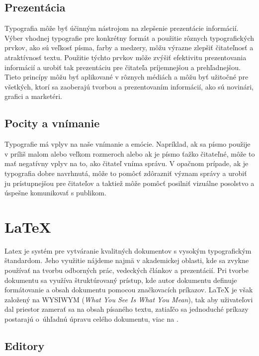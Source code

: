 \documentclass[a4paper, 11pt]{article}
\begin{document}
\subsection{Prezentácia}
Typografia môže byť účinným nástrojom na zlepšenie prezentácie informácií. Výber vhodnej typografie pre konkrétny formát a použitie rôznych typografických prvkov, ako sú veľkosť písma, farby a medzery, môžu výrazne zlepšiť čitateľnosť a atraktívnosť textu. Použitie týchto prvkov môže zvýšiť efektivitu prezentovania informácií a urobiť tak prezentáciu pre čitateľa príjemnejšou a prehľadnejšou. Tieto princípy môžu byť aplikované v rôznych médiách a môžu byť užitočné pre všetkých, ktorí sa zaoberajú tvorbou a prezentovaním informácií, ako sú novinári, grafici a marketéri. \cite{NovotnaMaria2019}

\subsection{Pocity a vnímanie}
Typografie má vplyv na naše vnímanie a emócie. Napríklad, ak sa písmo použije v príliš malom alebo veľkom rozmeroch alebo ak je písmo ťažko čitateľné, môže to mať negatívny vplyv na to, ako čitateľ vníma správu. V opačnom prípade, ak je typografia dobre navrhnutá, môže to pomôcť zdôrazniť význam správy a urobiť ju prístupnejšou pre čitateľov a taktiež môže pomôcť posilniť vizuálne posolstvo a úspešne komunikovať s publikom. \cite{LUPTON}

\section{\LaTeX}
Latex je systém pre vytváranie kvalitných dokumentov s vysokým typografickým štandardom. Jeho využitie nájdeme najmä v akademickej oblasti, kde sa zvykne používať na tvorbu odborných prác, vedeckých článkov a prezentácií. Pri tvorbe dokumentu sa využíva štruktúrovaný prístup, kde autor dokumentu definuje formátovanie a obsah dokumentu pomocou značkovacích príkazov. \LaTeX{} je však založený na WYSIWYM (\emph{What You See Is What You Mean}), tak aby uživateľovi dal priestor zamerať sa na obsah písaného textu, zatiaľčo sa jednoduché príkazy postarajú o~úhľadnú úpravu celého dokumentu, viac na \cite{Overleaf}.

\subsection{Editory}
\end{document}
